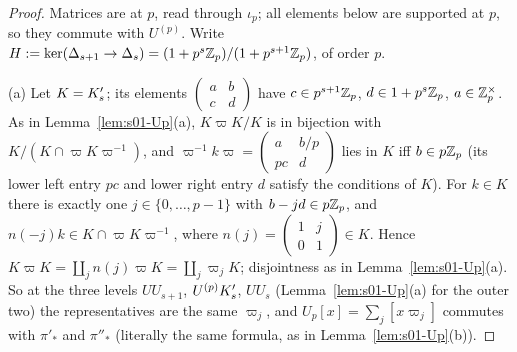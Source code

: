\begin{proof}
Matrices are at $p$, read through $\iota_p$; all elements below are supported at $p$, so they commute with $U^{(p)}$. Write
$H:=\ker(\Delta_{s+1}\to\Delta_s)=(1+p^s\mathbb{Z}_p)/(1+p^{s+1}\mathbb{Z}_p)$, of order $p$.

(a) Let $K=K'_{s}$; its elements $\left(\begin{smallmatrix}a&b\\c&d\end{smallmatrix}\right)$ have $c\in p^{s+1}\mathbb{Z}_p$, $d\in1+p^s\mathbb{Z}_p$,
$a\in\mathbb{Z}_p^\times$. As in Lemma~\ref{lem:s01-Up}(a), $K\varpi K/K$ is in bijection with $K/(K\cap\varpi K\varpi^{-1})$, and
$\varpi^{-1}k\varpi=\left(\begin{smallmatrix}a&b/p\\pc&d\end{smallmatrix}\right)$ lies in $K$ iff $b\in p\mathbb{Z}_p$ (its lower left entry $pc$
and lower right entry $d$ satisfy the conditions of $K$). For $k\in K$ there is exactly one $j\in\{0,\dots,p-1\}$ with
$b-jd\in p\mathbb{Z}_p$, and $n(-j)k\in K\cap\varpi K\varpi^{-1}$, where $n(j)=\left(\begin{smallmatrix}1&j\\0&1\end{smallmatrix}\right)\in K$.
Hence $K\varpi K=\coprod_jn(j)\varpi K=\coprod_j\varpi_jK$; disjointness as in Lemma~\ref{lem:s01-Up}(a). So at the three levels
$UU_{s+1}$, $U^{(p)}K'_{s}$, $UU_s$ (Lemma~\ref{lem:s01-Up}(a) for the outer two) the representatives are the same $\varpi_j$, and
$U_p[x]=\sum_j[x\varpi_j]$ commutes with $\pi'_*$ and $\pi''_*$ (literally the same formula, as in Lemma~\ref{lem:s01-Up}(b)).


\end{proof}
